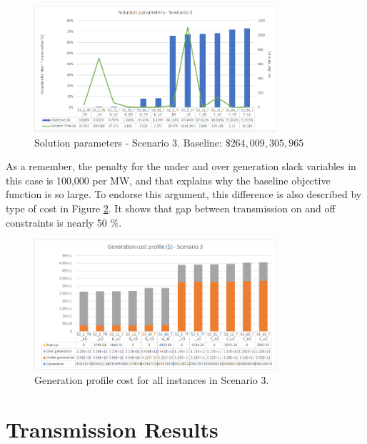 \documentclass[12pt,LUDisStyle,twosided]{book}
\begin{document}
\begin{figure}[H] 
  \centering
	  \includegraphics[width=0.8\textwidth,height=\textheight,keepaspectratio]{SolutionParametersS3.png}
  \caption{Solution parameters - Scenario 3. Baseline: $\$264,009,305,965$}
  \label{fig:solutionparameterss3}
\end{figure}

As a remember, the penalty for the under and over generation slack variables in this case is 100,000 per MW, and that explains why the baseline objective function is so large. To endorse this argument, this difference is also described by type of cost in Figure \ref{fig:genprofileS3}. It shows that gap between transmission on and off 
constraints is nearly 50 \%.

\begin{figure}[H] 
  \centering
  
	  \includegraphics[width=0.8\textwidth,keepaspectratio]{genprofileS3.png}
  
  \caption{Generation profile cost for all instances in Scenario 3.}
  \label{fig:genprofileS3}
\end{figure}

\newpage

\section{Transmission Results}
\end{document}

